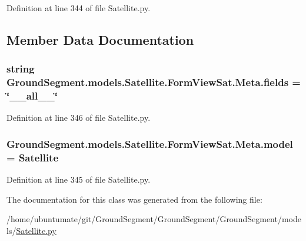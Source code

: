 Definition at line 344 of file Satellite.\+py.



\subsection{Member Data Documentation}
\hypertarget{class_ground_segment_1_1models_1_1_satellite_1_1_form_view_sat_1_1_meta_adba49f140eb2ffd6de1eff582d9d7d46}{}
\subsubsection[{fields}]{\setlength{\rightskip}{0pt plus 5cm}string Ground\+Segment.\+models.\+Satellite.\+Form\+View\+Sat.\+Meta.\+fields = \char`\"{}\+\_\+\+\_\+all\+\_\+\+\_\+\char`\"{}\hspace{0.3cm}{\ttfamily [static]}}\label{class_ground_segment_1_1models_1_1_satellite_1_1_form_view_sat_1_1_meta_adba49f140eb2ffd6de1eff582d9d7d46}


Definition at line 346 of file Satellite.\+py.

\hypertarget{class_ground_segment_1_1models_1_1_satellite_1_1_form_view_sat_1_1_meta_a40e3d789c88f51ff205f44aaf6c06a30}{}
\subsubsection[{model}]{\setlength{\rightskip}{0pt plus 5cm}Ground\+Segment.\+models.\+Satellite.\+Form\+View\+Sat.\+Meta.\+model = {\bf Satellite}\hspace{0.3cm}{\ttfamily [static]}}\label{class_ground_segment_1_1models_1_1_satellite_1_1_form_view_sat_1_1_meta_a40e3d789c88f51ff205f44aaf6c06a30}


Definition at line 345 of file Satellite.\+py.



The documentation for this class was generated from the following file\+:\begin{DoxyCompactItemize}
\item 
/home/ubuntumate/git/\+Ground\+Segment/\+Ground\+Segment/\+Ground\+Segment/models/\hyperlink{_satellite_8py}{Satellite.\+py}\end{DoxyCompactItemize}
